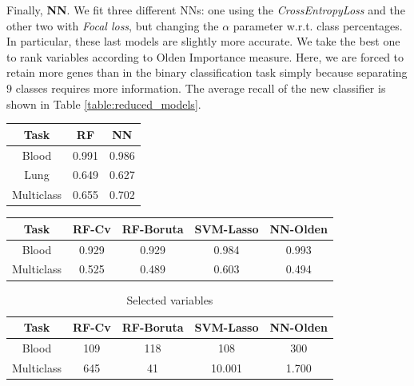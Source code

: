 \documentclass[a4paper,11pt, oneside]{article}  %
\begin{document}
Finally, \textbf{NN}. We fit three different NNs: one using the \textit{CrossEntropyLoss} and the other two with \textit{Focal loss}, but changing the $\alpha$ parameter w.r.t. class percentages. In particular, these last models are slightly more accurate. We take the best one to rank variables according to Olden Importance measure.  Here, we are forced to retain more genes than in the binary classification task simply because separating $9$ classes requires more information. The average recall of the new classifier is shown in Table \ref{table:reduced_models}.
\bigskip

\begin{minipage}[c]{0.4\textwidth}
	\centering
	\begin{tabular}{c c c}
		\hline\hline
		Task & RF & NN \\ [0.5ex] %
		\hline
		Blood & 0.991  & 0.986 \\
		Lung & 0.649  & 0.627 \\
		Multiclass & 0.655 & 0.702 \\ [1ex]
		\hline
	\end{tabular}
	\label{table:big_models}
\end{minipage}
\hspace{0.3cm}
\begin{minipage}[c]{0.5\textwidth}
	\centering
	\begin{tabular}{c c c c c}
		\hline\hline
		Task & RF-Cv & RF-Boruta & SVM-Lasso & NN-Olden \\ [0.5ex]
		\hline
		Blood & 0.929 & 0.929 & 0.984 & 0.993 \\
		Multiclass & 0.525 & 0.489 & 0.603 & 0.494 \\ [1ex]
		\hline
	\end{tabular}
	\label{table:reduced_models}
\end{minipage}
\bigskip

\begin{table}[h!]
	\centering
	\begin{tabular}{c c c c c}
		\hline\hline
		Task & RF-Cv &  RF-Boruta & SVM-Lasso & NN-Olden \\ [0.5ex] 
		\hline
		Blood & 109 & 118 & 108 & 300 \\
		Multiclass & 645 &  41 & 10.001 & 1.700 \\ [1ex]
		\hline
	\end{tabular}
	\caption{Selected variables}
	\label{table:selected variables}
\end{table}
\end{document}
